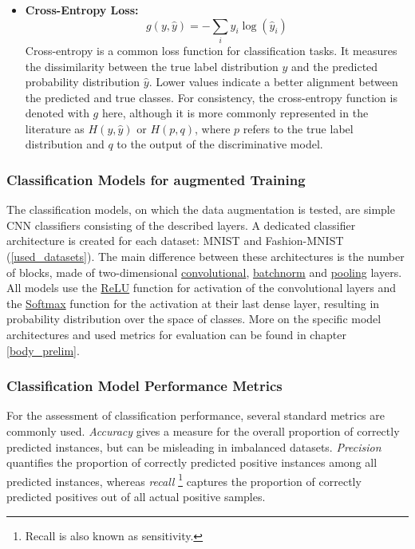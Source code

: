 \begin{itemize}
    \item \textbf{Cross-Entropy Loss:} \label{theoretical_loss_crossentropy}
    \begin{equation}
        g(y, \hat{y}) = -\sum_{i} y_i \log(\hat{y}_i)
    \end{equation}
    Cross-entropy is a common loss function for classification tasks. It measures the dissimilarity between the true label distribution \( y \) and the predicted probability distribution \( \hat{y} \). Lower values indicate a better alignment between the predicted and true classes. For consistency, the cross-entropy function is denoted with \( g \) here, although it is more commonly represented in the literature as \( H(y, \hat{y}) \) or \( H(p, q) \), where \( p \) refers to the true label distribution and \( q \) to the output of the discriminative model.


\end{itemize}

\subsubsection{Classification Models for augmented Training}
The classification models, on which the data augmentation is tested, are simple CNN classifiers consisting of the described layers. A dedicated classifier architecture is created for each dataset: MNIST and Fashion-MNIST (\ref{used_datasets}). The main difference between these architectures is the number of blocks, made of two-dimensional \hyperref[theoretical_classification_conv_layers]{convolutional}, \hyperref[theoretical_classification_batchnorm_layers]{batchnorm} and \hyperref[theoretical_classification_pooling_layers]{pooling} layers. All models use the \hyperref[theoretical_activations_relu]{ReLU} function for activation of the convolutional layers and the \hyperref[theoretical_activations_softmax]{Softmax} function for the activation at their last dense layer, resulting in probability distribution over the space of classes. More on the specific model architectures and used metrics for evaluation can be found in chapter \ref{body_prelim}.

\subsubsection{Classification Model Performance Metrics} \label{theory_classification_performanc_metrics}
For the assessment of classification performance, several standard metrics are commonly used. \textit{Accuracy} gives a measure for the overall proportion of correctly predicted instances, but can be misleading in imbalanced datasets. \textit{Precision} quantifies the proportion of correctly predicted positive instances among all predicted instances, whereas \textit{recall} \footnote{Recall is also known as sensitivity.} captures the proportion of correctly predicted positives out of all actual positive samples.

